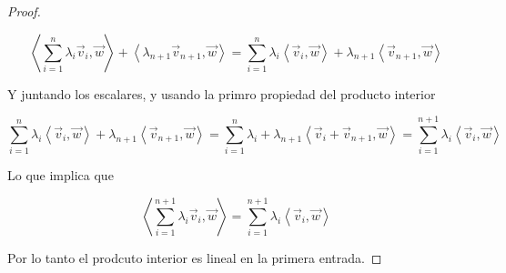 \documentclass[12pt]{article}
\begin{document}
\begin{proof}
\begin{enumerate}
        $$\left\langle \sum_{i=1}^{n} \lambda_i \vec{v}_i, \vec{w} \right\rangle + \left\langle \lambda_{n+1} \vec{v}_{n+1}, \vec{w} \right\rangle = \sum_{i=1}^{n} \lambda_i \left\langle \vec{v}_i, \vec{w} \right\rangle + \lambda_{n+1} \left\langle \vec{v}_{n+1}, \vec{w} \right\rangle$$

        Y juntando los escalares, y usando la primro propiedad del producto interior

        $$\sum_{i=1}^{n} \lambda_i \left\langle \vec{v}_i, \vec{w} \right\rangle + \lambda_{n+1} \left\langle \vec{v}_{n+1}, \vec{w} \right\rangle = \sum_{i=1}^{n} \lambda_i + \lambda_{n+1} \left\langle \vec{v}_i + \vec{v}_{n+1}, \vec{w} \right\rangle = \sum_{i=1}^{n+1} \lambda_i \left\langle \vec{v}_i, \vec{w} \right\rangle $$

        Lo que implica que 

        $$\left\langle \sum_{i=1}^{n+1} \lambda_i \vec{v}_i, \vec{w} \right\rangle = \sum_{i=1}^{n+1} \lambda_i \left\langle \vec{v}_i, \vec{w} \right\rangle$$

    \end{enumerate}
    Por lo tanto el prodcuto interior es lineal en la primera entrada. 
    
\end{proof}
\end{document}
